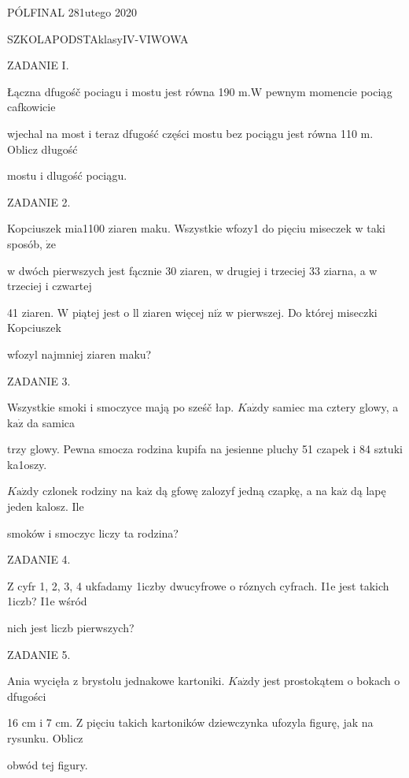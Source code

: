 \documentclass[a4paper,12pt]{article}
\begin{document}
PÓLFINAL 281utego 2020

SZKOLAPODSTAklasyIV-VIWOWA

ZADANIE I.

Łączna dfugośč pociagu i mostu jest równa 190 $\mathrm{m}. \mathrm{W}$ pewnym momencie pociąg cafkowicie

wjechal na most i teraz dfugość części mostu bez pociągu jest równa 110 $\mathrm{m}$. Oblicz długość

mostu i dlugość pociągu.

ZADANIE 2.

Kopciuszek mia1100 ziaren maku. Wszystkie wfozy1 do pięciu miseczek w taki sposób, $\dot{\mathrm{z}}\mathrm{e}$

w dwóch pierwszych jest fącznie 30 ziaren, w drugiej i trzeciej 33 ziarna, a w trzeciej i czwartej

41 ziaren. $\mathrm{W}$ piątej jest o ll ziaren więcej $\mathrm{n}\mathrm{i}\dot{\mathrm{z}}$ w pierwszej. Do której miseczki Kopciuszek

wfozyl najmniej ziaren maku?

ZADANIE 3.

Wszystkie smoki i smoczyce mają po sześč łap. $K\mathrm{a}\dot{\mathrm{z}}\mathrm{d}\mathrm{y}$ samiec ma cztery glowy, a $\mathrm{k}\mathrm{a}\dot{\mathrm{z}}$ da samica

trzy glowy. Pewna smocza rodzina kupifa na jesienne pluchy 51 czapek i 84 sztuki ka1oszy.

$K\mathrm{a}\dot{\mathrm{z}}\mathrm{d}\mathrm{y}$ czlonek rodziny na $\mathrm{k}\mathrm{a}\dot{\mathrm{z}}$ dą gfowę zalozyf jedną czapkę, a na $\mathrm{k}\mathrm{a}\dot{\mathrm{z}}$ dą lapę jeden kalosz. Ile

smoków i smoczyc liczy ta rodzina?

ZADANIE 4.

$\mathrm{Z}$ cyfr 1, 2, 3, 4 ukfadamy 1iczby dwucyfrowe o róznych cyfrach. I1e jest takich 1iczb? I1e wśród

nich jest liczb pierwszych?

ZADANIE 5.

Ania wycięła z brystolu jednakowe kartoniki. $K\mathrm{a}\dot{\mathrm{z}}\mathrm{d}\mathrm{y}$ jest prostokątem o bokach o dfugości

16 cm i 7 cm. $\mathrm{Z}$ pięciu takich kartoników dziewczynka ufozyla figurę, jak na rysunku. Oblicz

obwód tej figury.
\end{document}
